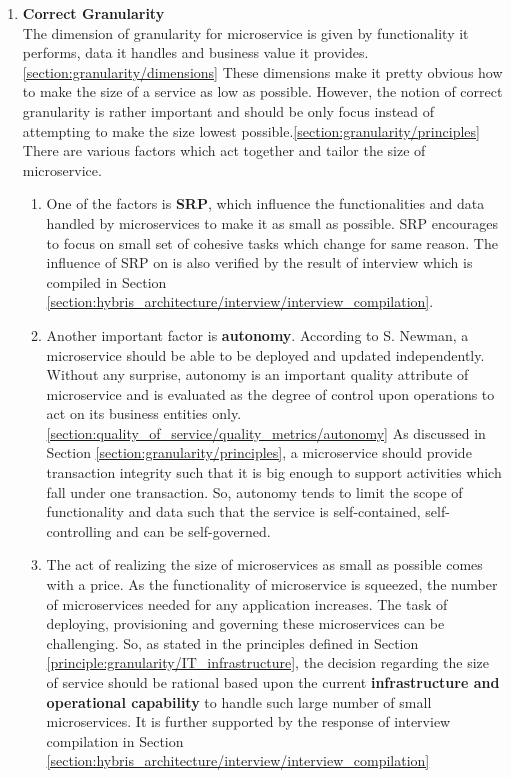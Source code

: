 \begin{enumerate}
\item \textbf{Correct Granularity} \\
The dimension of granularity for microservice is given by functionality it performs, data it handles and business value it provides. \ref{section:granularity/dimensions} These dimensions make it pretty obvious how to make the size of a service as low as possible. However, the notion of correct granularity is rather important and should be only focus instead of attempting to make the size lowest possible.\ref{section:granularity/principles} There are various factors which act together and tailor the size of microservice.
\begin{enumerate}
\item One of the factors is \textbf{\acrshort{SRP}}, which influence the functionalities and data handled by microservices to make it as small as possible. \acrshort{SRP} encourages to focus on small set of cohesive tasks which change for same reason. \cite{Stine:2014aa} \cite{Newman:2015aa} The influence of \acrshort{SRP} on is also verified by the result of interview which is compiled in Section \ref{section:hybris_architecture/interview/interview_compilation}.
\item Another important factor is \textbf{autonomy}. According to S. Newman, a microservice should be able to be deployed and updated independently. \cite{Newman:2015aa} Without any surprise, autonomy is an important quality attribute of microservice and is evaluated as the degree of control upon operations to act on its business entities only. \ref{section:quality_of_service/quality_metrics/autonomy} As discussed in Section \ref{section:granularity/principles}, a microservice should provide transaction integrity such that it is big enough to support activities which fall under one transaction. So, autonomy tends to limit the scope of functionality and data such that the service is self-contained, self-controlling and can be self-governed.\cite{Ma:2007aa}
\item The act of realizing the size of microservices as small as possible comes with a price. As the functionality of microservice is squeezed, the number of microservices needed for any application increases. The task of deploying, provisioning and governing these microservices can be challenging. So, as stated in the principles defined in Section  \ref{principle:granularity/IT_infrastructure},  the decision regarding the size of service should be rational based upon the current \textbf{infrastructure and operational capability} to handle such large number of small microservices. It is further supported by the response of interview compilation in Section \ref{section:hybris_architecture/interview/interview_compilation}

\end{enumerate}
\end{enumerate}
